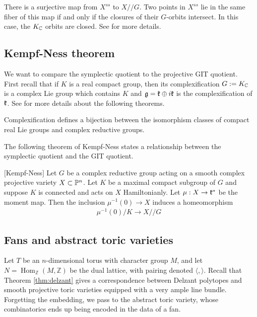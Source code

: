 \begin{remark}
    There is a surjective map from $X^{ss}$ to $X//G$. Two points in $X^{ss}$ lie in the same fiber of this map if and only if the closures of their 
    $G$-orbits intersect. In this case, the $K_\C$ orbits are closed. See \cite{proudfoot} for more details.
\end{remark}
\subsection{Kempf-Ness theorem}
We want to compare the symplectic quotient to the projective GIT quotient.  First recall
that if $K$ is a real compact group, then its complexification $G := K_\C$ is a 
complex Lie group which contains $K$ and $\mf g = \mf k \oplus i\mf k$ is the complexification of $\mf k$. See \cite{hoskins} for more details about the following theorems.

\begin{theorem}
    Complexification defines a bijection between the isomorphism
    classes of compact real Lie groups and complex reductive groups.
\end{theorem}
The following theorem of Kempf-Ness states a relationship between the symplectic quotient and the GIT quotient.
\begin{theorem}{\label{thm:kempf-ness}}
    [Kempf-Ness] 
    Let $G$ be a complex reductive group acting on a smooth complex projective variety 
    $X\subset \P^n$. Let $K$ be a maximal compact subgroup of $G$ and suppose $K$ 
    is connected and acts on $X$ Hamiltonianly. Let $\mu:X\to\mf k^*$ be the moment map. 
    Then the inclusion $\mu^{-1}(0)\to X$ induces a homeomorphism \begin{align*}
        \mu^{-1}(0)/K \to X//G
    \end{align*}
\end{theorem}

\begin{remark}
\end{remark}

\subsection{Fans and abstract toric varieties}

Let \( T \) be an \( n \)-dimensional torus with character group \( M \),
 and let \( N = \operatorname{Hom}_{\mathbb{Z}}(M, \mathbb{Z}) \) be
  the dual lattice, with pairing denoted \( \langle , \rangle \). Recall that Theorem \ref{thm:delzant} gives a correspondence between Delzant polytopes 
and smooth projective toric varieties equipped with a very ample line bundle.
Forgetting the embedding, we pass to the abstract toric variety, whose combinatorics 
ends up being encoded in the data of a fan.

